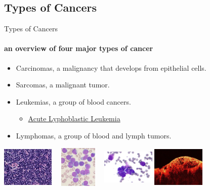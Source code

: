 \documentclass{beamer}
\begin{document}
    \subsection{Types of Cancers}

\begin{frame}{Types of Cancers}
  \framesubtitle{an overview of four major types of cancer}
  \begin{itemize}
    \item Carcinomas, a malignancy that develops from epithelial cells.
    \item Sarcomas, a malignant tumor.
    \item Leukemias, a group of blood cancers.
          \begin{itemize}
            \item \hyperlink{all}{Acute Lyphoblastic Leukemia}
          \end{itemize}
    \item Lymphomas, a group of blood and lymph tumors.
  \end{itemize}
  \vfill
  \hfill \includegraphics[width=25mm,height=20mm]{resources/lymphomas}
  \hfill \includegraphics[width=25mm,height=20mm]{resources/leukemias}
  \hfill \includegraphics[width=25mm,height=20mm]{resources/carincomas}
  \hfill \includegraphics[width=25mm,height=20mm]{resources/sarcomas}
  \hfill

\end{frame}
\end{document}
